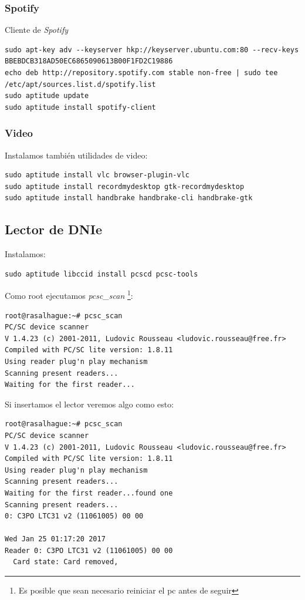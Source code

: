\documentclass[12pt,spanish,]{article}
\begin{document}
\subsubsection{Spotify}\label{spotify}

Cliente de \emph{Spotify}

\begin{verbatim}
sudo apt-key adv --keyserver hkp://keyserver.ubuntu.com:80 --recv-keys BBEBDCB318AD50EC6865090613B00F1FD2C19886
echo deb http://repository.spotify.com stable non-free | sudo tee /etc/apt/sources.list.d/spotify.list
sudo aptitude update
sudo aptitude install spotify-client
\end{verbatim}

\subsubsection{Video}\label{video}

Instalamos también utilidades de video:

\begin{verbatim}
sudo aptitude install vlc browser-plugin-vlc
sudo aptitude install recordmydesktop gtk-recordmydesktop
sudo aptitude install handbrake handbrake-cli handbrake-gtk
\end{verbatim}

\subsection{Lector de DNIe}\label{lector-de-dnie}

Instalamos:

\begin{verbatim}
sudo aptitude libccid install pcscd pcsc-tools
\end{verbatim}

Como root ejecutamos \emph{pcsc\_scan} \footnote{Es posible que sean
  necesario reiniciar el pc antes de seguir}:

\begin{verbatim}
root@rasalhague:~# pcsc_scan 
PC/SC device scanner
V 1.4.23 (c) 2001-2011, Ludovic Rousseau <ludovic.rousseau@free.fr>
Compiled with PC/SC lite version: 1.8.11
Using reader plug'n play mechanism
Scanning present readers...
Waiting for the first reader...
\end{verbatim}

Si insertamos el lector veremos algo como esto:

\begin{verbatim}
root@rasalhague:~# pcsc_scan 
PC/SC device scanner
V 1.4.23 (c) 2001-2011, Ludovic Rousseau <ludovic.rousseau@free.fr>
Compiled with PC/SC lite version: 1.8.11
Using reader plug'n play mechanism
Scanning present readers...
Waiting for the first reader...found one
Scanning present readers...
0: C3PO LTC31 v2 (11061005) 00 00

Wed Jan 25 01:17:20 2017
Reader 0: C3PO LTC31 v2 (11061005) 00 00
  Card state: Card removed, 
\end{verbatim}
\end{document}
